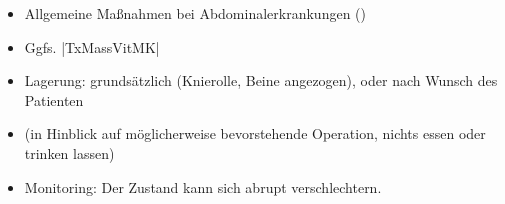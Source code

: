 \label{m:akutes-abdomen}%
\begin{itemize}
  \item Allgemeine Maßnahmen bei Abdominalerkrankungen
  ()
  \item {} Ggfs.
  |TxMassVitMK|
  \item Lagerung: grundsätzlich 
  (Knierolle, Beine angezogen), oder nach Wunsch des Patienten
  \item {} (in Hinblick auf möglicherweise
  bevorstehende Operation, nichts essen oder trinken lassen)
  \item Monitoring: Der Zustand kann sich abrupt
  verschlechtern.
\end{itemize}